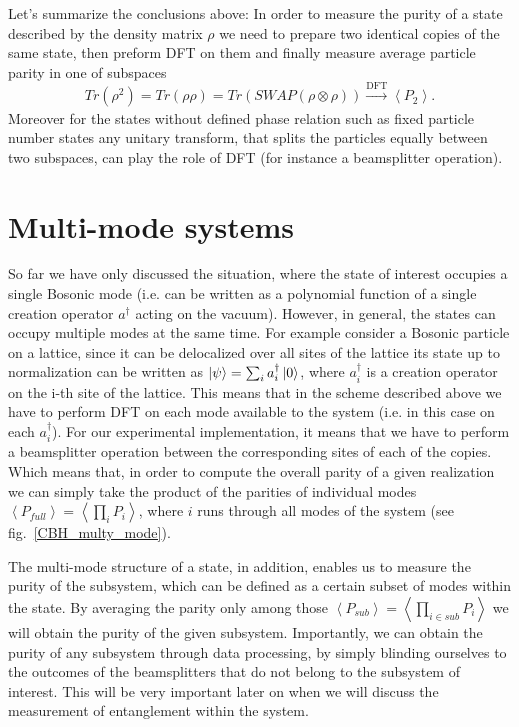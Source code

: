 Let's summarize the conclusions above: In order to measure the purity of a state described by the density matrix $\rho$ we need to prepare two identical copies of the same state, then preform DFT on them and finally measure average particle parity in one of subspaces
\begin{equation}
Tr(\rho^2) = Tr(\rho\rho) = Tr(SWAP(\rho \otimes \rho)) \xrightarrow[]{\text{DFT}} \left< P_2 \right>.
\end{equation}
Moreover for the states without defined phase relation such as fixed particle number states any unitary transform, that splits the particles equally between two subspaces, can play the role of DFT (for instance a beamsplitter operation).

\section{Multi-mode systems}
So far we have only discussed the situation, where the state of interest occupies a single Bosonic mode (i.e. can be written as a polynomial function of a single creation operator $a^{\dagger}$ acting on the vacuum). However, in general, the states can occupy multiple modes at the same time. For example consider a Bosonic particle on a lattice, since it can be delocalized over all sites of the lattice its state up to normalization can be written as $\left|\psi\right\rangle = \sum_i a_i^{\dagger} \left|0\right\rangle$, where $a_i^{\dagger}$ is a creation operator on the i-th site of the lattice. This means that in the scheme described above we have to perform DFT on each mode available to the system (i.e. in this case on each $a_i^{\dagger}$). For our experimental implementation, it means that we have to perform a beamsplitter operation between the corresponding sites of each of the copies. Which means that, in order to compute the overall parity of a given realization we can simply take the product of the parities of individual modes $\left<P_{full}\right> = \left< \prod_i P_i \right>$, where $i$ runs through all modes of the system (see fig.~\ref{CBH_multy_mode}).

The multi-mode structure of a state, in addition, enables us to measure the purity of the subsystem, which can be defined as a certain subset of modes within the state. By averaging the parity only among those $\left<P_{sub}\right> = \left< \prod_{i \in sub} P_i \right>$ we will obtain the purity of the given subsystem.  Importantly, we can obtain the purity of any subsystem through data processing, by simply blinding ourselves to the outcomes of the beamsplitters that do not belong to the subsystem of interest. This will be very important later on when we will discuss the measurement of entanglement within the system.

